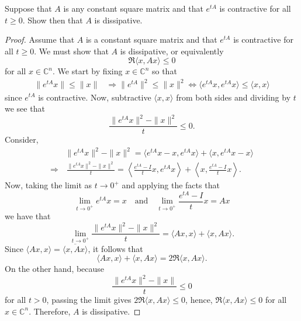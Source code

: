 \documentclass{exam}
\newcommand{\CC}{\mathbb C}
\begin{document}
\begin{questions}
        \question Suppose that $A$ is any constant square matrix and that $e^{tA}$ is contractive for all $t \geq 0$. Show then that $A$ is dissipative. 
        \begin{solution}
            \begin{proof}
                Assume that $A$ is a constant square matrix and that $e^{tA}$ is contractive for all $t \geq 0$. We must show that $A$ is dissipative, or equivalently
                \[
                    \Re\langle x, Ax \rangle \leq 0 
                \]
                for all $x \in \CC^n$. We start by fixing $x \in \CC^n$ so that 
                \begin{align*}
                    \|e^{tA}x\| \leq \|x\| &\Rightarrow \| e^{tA}\| ^2 \leq \|x\|^2 \Leftrightarrow \langle e^{tA}x, e^{tA}x \rangle \leq \langle x, x \rangle 
                \end{align*}
                since $e^{tA}$ is contractive. Now, subtractive $\langle x, x \rangle$ from both sides and dividing by $t$ we see that 
                \[
                    \frac{\|e^{tA}x\|^2 - \|x\|^2}{t} \leq 0.
                \]
                Consider, 
                \begin{align*}
                    &\|e^{tA}x\|^2 - \|x\|^2 = \langle e^{tA}x - x, e^{tA}x\rangle + \langle x, e^{tA}x - x\rangle \\
                    \Rightarrow&\, \frac{\|e^{tA}x\|^2 - \|x\|^2}{t} = \left\langle \frac{e^{tA} - I}{t}x, e^{tA}x\right\rangle + \left\langle x, \frac{e^{tA} - I}{t}x\right\rangle.
                \end{align*}
                Now, taking the limit as $t \to 0^{+}$ and applying the facts that 
                \[
                    \lim_{t \to 0^+} e^{tA}x = x \quad\text{and}\quad \lim_{t \to 0^+} \frac{e^{tA} - I}{t}x = Ax 
                \]
                we have that 
                \[
                    \lim_{t \to 0^+} \frac{\|e^{tA}x\|^2 - \|x\|^2}{t} = \langle Ax, x \rangle + \langle x, Ax \rangle.
                \]
                Since $\langle Ax, x \rangle = \overline{\langle x, Ax \rangle}$, it follows that 
                \[
                    \langle Ax, x \rangle + \langle x, Ax \rangle = 2\Re\langle x, Ax \rangle.
                \]
                On the other hand, because 
                \[
                    \frac{\|e^{tA}x\|^2 - \|x\|}{t} \leq 0  
                \]
                for all $t > 0$, passing the limit gives $2\Re\langle x, Ax\rangle \leq 0$, hence, $\Re\langle x, Ax\rangle \leq 0$ for all $x \in \CC^n$. Therefore, $A$ is dissipative.
            \end{proof}
        \end{solution}


\end{questions}
\end{document}

